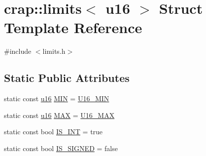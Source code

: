\hypertarget{structcrap_1_1limits_3_01u16_01_4}{\section{crap\-:\-:limits$<$ u16 $>$ Struct Template Reference}
\label{structcrap_1_1limits_3_01u16_01_4}
}


{\ttfamily \#include $<$limits.\-h$>$}

\subsection*{Static Public Attributes}
\begin{DoxyCompactItemize}
\item 
static const \hyperlink{types_8h_ace9d960e74685e2cd84b36132dbbf8aa}{u16} \hyperlink{structcrap_1_1limits_3_01u16_01_4_ac704c0d0f11c157ac4f1a4abd49c2bb8}{M\-I\-N} = \hyperlink{types_8h_a80b4ee16c02644eef90553da09dc0907}{U16\-\_\-\-M\-I\-N}
\item 
static const \hyperlink{types_8h_ace9d960e74685e2cd84b36132dbbf8aa}{u16} \hyperlink{structcrap_1_1limits_3_01u16_01_4_afe9d8a17c2f0208f423347b1744ac06d}{M\-A\-X} = \hyperlink{types_8h_ac580728e242e90fe3082dc7fe45ec6c9}{U16\-\_\-\-M\-A\-X}
\item 
static const bool \hyperlink{structcrap_1_1limits_3_01u16_01_4_aac89c7feebcee8d2995ad4f673bd2b2b}{I\-S\-\_\-\-I\-N\-T} = true
\item 
static const bool \hyperlink{structcrap_1_1limits_3_01u16_01_4_a8b3d63b1536b733d7050d518cf81ae6a}{I\-S\-\_\-\-S\-I\-G\-N\-E\-D} = false
\end{DoxyCompactItemize}


